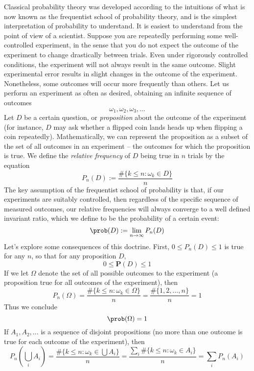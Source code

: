 Classical probability theory was developed according to the intuitions of what is now known as the frequentist school of probability theory, and is the simplest interpretation of probability to understand. It is easiest to understand from the point of view of a scientist. Suppose you are repeatedly performing some well-controlled experiment, in the sense that you do not expect the outcome of the experiment to change drastically between trials. Even under rigorously controlled conditions, the experiment will not always result in the same outcome. Slight experimental error results in slight changes in the outcome of the experiment. Nonetheless, some outcomes will occur more frequently than others. Let us perform an experiment as often as desired, obtaining an infinite sequence of outcomes
%
\[ \omega_1, \omega_2, \omega_3, \dots \]
%
Let $D$ be a certain question, or {\it proposition} about the outcome of the experiment (for instance, $D$ may ask whether a flipped coin lands heads up when flipping a coin repeatedly). Mathematically, we can represent the proposition as a subset of the set of all outcomes in an experiment -- the outcomes for which the proposition is true. We define the {\it relative frequency} of $D$ being true in $n$ trials by the equation
%
\[ P_n(D) := \frac{\# \{ k \leq n : \omega_k \in D \}}{n} \]
%
The key assumption of the frequentist school of probability is that, if our experiments are suitably controlled, then regardless of the specific sequence of measured outcomes, our relative frequencies will always converge to a well defined invariant ratio, which we define to be the probability of a certain event:
%
\[ \prob(D) := \lim_{n \to \infty} P_n(D) \]
%
Let's explore some consequences of this doctrine. First, $0 \leq P_n(D) \leq 1$ is true for any $n$, so that for any proposition $D$,
%
\begin{equation}\label{prob0lessthan1} 0 \leq \mathbf{P}(D) \leq 1 \end{equation}
%
If we let $\Omega$ denote the set of all possible outcomes to the experiment (a proposition true for all outcomes of the experiment), then
%
\[ P_n(\Omega) = \frac{\# \{ k \leq n : \omega_k \in \Omega\}}{n} = \frac{\# \{ 1, 2, \dots, n \}}{n} = 1 \]
%
Thus we conclude
%
\begin{equation}\label{probspace1} \prob(\Omega) = 1 \end{equation}
%
If $A_1, A_2, \dots$ is a sequence of disjoint propositions (no more than one outcome is true for each outcome of the experiment), then
%
\[ P_n \left( \bigcup_i A_i \right) = \frac{\# \{ k \leq n : \omega_k \in \bigcup A_i \}}{n} = \frac{\sum_i \# \{ k \leq n : \omega_k \in A_i \}}{n} = \sum_i P_n(A_i) \]

